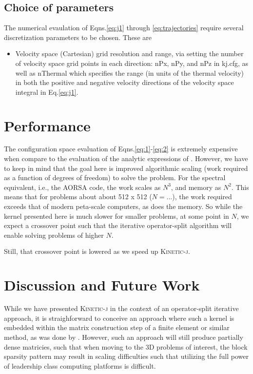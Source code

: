 \documentclass[final,5p,times,twocolumn]{elsarticle}
\newcommand{\kj}{\textsc{Kinetic-j}\xspace}
\begin{document}
\subsection{Choice of parameters}
\label{section:parameters}
%
The numerical evaulation of Eqns.\ref{eq:j1} through \ref{eq:trajectories} require several discretization parameters to be chosen. These are 
%
\begin{itemize}
\item{Velocity space (Cartesian) grid resolution and range, via setting the number of velocity space grid points in each direction: nPx, nPy, and nPz in kj.cfg, as well as nThermal which specifies the range (in units of the thermal velocity) in both the positive and negative velocity directions of the velocity space integral in Eq.\ref{eq:j1}.}
\end{itemize}

\section{Performance}
\label{section:performance}
The configuration space evaluation of Eqns.\ref{eq:1}-\ref{eq:2} is extremely expensive when compare to the evaluation of the analytic expressions of \cite{stix}. However, we have to keep in mind that the goal here is improved algorithmic scaling (work required as a function of degrees of freedom) to solve the problem. For the spectral equivalent, i.e., the AORSA code, the work scales as $N^3$, and memory as $N^2$. This means that for problems about about 512 x 512 ($N=...$), the work required exceeds that of modern peta-scale computers, as does the memory. So while the kernel presented here is much slower for smaller problems, at some point in $N$, we expect a crossover point such that the iterative operator-split algorithm will enable solving problems of higher $N$. 

Still, that crossover point is lowered as we speed up \kj.

\section{Discussion and Future Work}
\label{section:discussion}
While we have presented \kj in the context of an operator-split iterative approach, it is straighforward to conceive an approach where such a kernel is embedded within the matrix construction step of a finite element or similar method, as was done by \cite{svidzinski2016}. However, such an approach will still produce partially dense matricies, such that when moving to the 3D problems of interest, the block sparsity pattern may result in scaling difficulties such that utilizing the full power of leadership class computing platforms is difficult. 
\end{document}
